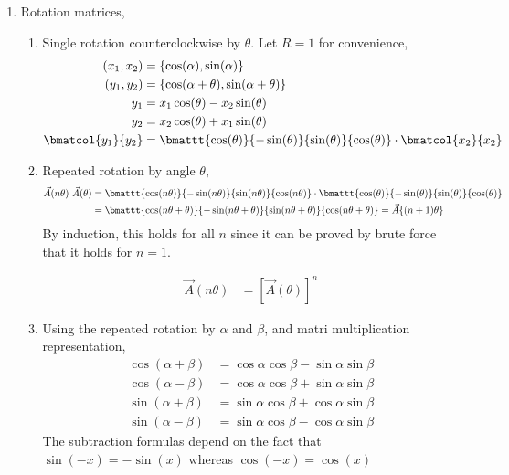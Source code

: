 \begin{enumerate}
\item Rotation matrices,
\begin{enumerate}
\item Single rotation counterclockwise by $ \theta $. Let $ R = 1 $ for
convenience,
\begin{align}
    (x_1, x_2)         & = \{\cos(\alpha), \sin(\alpha)\}       \\
    (y_1, y_2)         & = \{\cos(\alpha + \theta),
    \sin(\alpha+ \theta)\}                                      \\
    y_1                & = x_1 \cos(\theta) - x_2 \sin(\theta)  \\
    y_2                & = x_2 \cos(\theta) + x_1 \sin(\theta)  \\
    \bmatcol{y_1}{y_2} & = \bmattt{\cos(\theta)}{-\sin(\theta)}
    {\sin(\theta)}{\cos(\theta)} \cdot \bmatcol{x_2}{x_2}
\end{align}

\item Repeated rotation by angle $ \theta $,
\begin{align}
    \vec{A}(n\theta)\ \vec{A}(\theta) & = \bmattt
    {\cos(n\theta)}{-\sin(n\theta)}
    {\sin(n\theta)}{\cos(n\theta)} \cdot
    \bmattt{\cos(\theta)}{-\sin(\theta)}
    {\sin(\theta)}{\cos(\theta)}                  \\
                                      & = \bmattt
    {\cos(n\theta +\theta)}{-\sin(n\theta +\theta)}
    {\sin(n\theta +\theta)}{\cos(n\theta +\theta)}
    = \vec{A}\{(n+1)\theta\}
\end{align}
By induction, this holds for all $ n $ since it can be proved by
brute force that it holds for $ n = 1 $. \par
\begin{align}
    \vec{A}(n\theta) & = [\vec{A}(\theta)]^n
\end{align}

\item Using the repeated rotation by $ \alpha $ and $ \beta $, and
matri multiplication representation,
\begin{align}
    \cos(\alpha + \beta) & = \cos \alpha \cos \beta
    - \sin \alpha \sin \beta                        \\
    \cos(\alpha - \beta) & = \cos \alpha \cos \beta
    + \sin \alpha \sin \beta                        \\
    \sin(\alpha + \beta) & = \sin \alpha \cos \beta
    + \cos \alpha \sin \beta                        \\
    \sin(\alpha - \beta) & = \sin \alpha \cos \beta
    - \cos \alpha \sin \beta
\end{align}
The subtraction formulas depend on the fact that $ \sin(-x) =
    -\sin(x) $ whereas $ \cos(-x) = \cos(x) $


\end{enumerate}
\end{enumerate}
